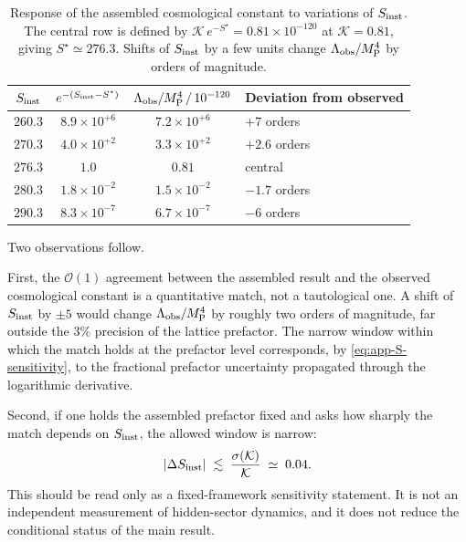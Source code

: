 \documentclass[a4paper,11pt]{article}
\theoremstyle{definition}
\newcommand{\MP}{M_{\rm P}}
\newcommand{\Lobs}{\Lambda_{\rm obs}}
\begin{document}
\begin{table}[h]
\centering
\begin{tabular}{cccl}
\toprule
$S_{\rm inst}$ &
$e^{-(S_{\rm inst} - S^\star)}$ &
$\Lobs/\MP^4 \,/\, 10^{-120}$ &
Deviation from observed \\
\midrule
$260.3$ & $8.9 \times 10^{+6}$ & $7.2 \times 10^{+6}$ & $+7$ orders \\
$270.3$ & $4.0 \times 10^{+2}$ & $3.3 \times 10^{+2}$ & $+2.6$ orders \\
$276.3$ & $1.0$                & $0.81$               & central \\
$280.3$ & $1.8 \times 10^{-2}$ & $1.5 \times 10^{-2}$ & $-1.7$ orders \\
$290.3$ & $8.3 \times 10^{-7}$ & $6.7 \times 10^{-7}$ & $-6$ orders \\
\bottomrule
\end{tabular}
\caption{Response of the assembled cosmological constant to variations
of $S_{\rm inst}$. The central row is defined by
$\mathcal{K}\,e^{-S^\star} = 0.81 \times 10^{-120}$ at
$\mathcal{K} = 0.81$, giving $S^\star \simeq 276.3$. Shifts of
$S_{\rm inst}$ by a few units change $\Lobs/\MP^4$ by orders of
magnitude.}
\label{tab:app-S-sensitivity}
\end{table}

Two observations follow.

First, the $\mathcal{O}(1)$ agreement between the assembled result and
the observed cosmological constant is a quantitative match, not a
tautological one. A shift of $S_{\rm inst}$ by $\pm 5$ would change
$\Lobs/\MP^4$ by roughly two orders of magnitude, far outside the $3\%$
precision of the lattice prefactor. The narrow window within which the
match holds at the prefactor level corresponds, by
\eqref{eq:app-S-sensitivity}, to the fractional prefactor uncertainty
propagated through the logarithmic derivative.

Second, if one holds the assembled prefactor fixed and asks how
sharply the match depends on $S_{\rm inst}$, the allowed window is
narrow:
\begin{equation}
|\Delta S_{\rm inst}|
\;\lesssim\;
\frac{\sigma(\mathcal{K})}{\mathcal{K}}
\;\simeq\; 0.04 .
\label{eq:app-S-precision}
\end{equation}
This should be read only as a fixed-framework sensitivity statement.
It is not an independent measurement of hidden-sector dynamics, and it
does not reduce the conditional status of the main result.




\end{document}
